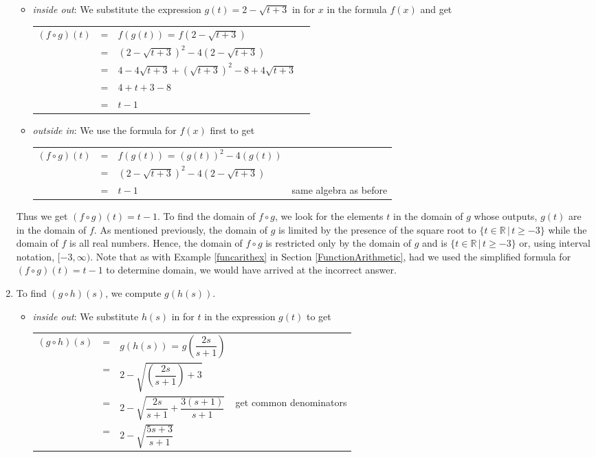 \documentclass{ximera}
\begin{document}
\begin{example}
\begin{enumerate}
\begin{itemize}
\item  \textit{inside out}: We substitute the expression $g(t) = 2 - \sqrt{t+3}$ in for $x$ in the formula $f(x)$ and get 
\begin{longtable}{rclr} $(f \circ g)(t)$ & = & $f(g(t))$ = $f\left(2-\sqrt{t+3}\right)$ & \\ [2pt]
 & = & $\left(2-\sqrt{t+3}\right)^2 - 4\left(2-\sqrt{t+3}\right)$ & \\[2pt] 
 & = & $4 - 4\sqrt{t+3} + \left(\sqrt{t+3}\right)^2 - 8 + 4 \sqrt{t+3}$ & \\ [2pt]
 & = & $4 + t+3 - 8$ & \\ 
 & = & $t-1$ & \\
 \end{longtable}

\item  \textit{outside in}:  We use the formula for $f(x)$ first to get
\begin{longtable}{rclr} $(f \circ g)(t)$ & = & $f(g(t))$ = $\left(g(t)\right)^2 - 4\left(g(t)\right)$& \\ [2pt]
 & = & $\left(2-\sqrt{t+3}\right)^2 - 4\left(2-\sqrt{t+3}\right)$ & \\[2pt] 
 & = & $t-1$ & same algebra as before \\
 \end{longtable}

\end{itemize}

Thus we get $(f \circ g)(t) = t-1$.  To find the domain of $f \circ g$, we look for the elements $t$ in the domain of $g$ whose outputs, $g(t)$ are in the domain of $f$.   As mentioned previously, the domain of $g$ is limited by the presence of the square root to  $\{ t \in \mathbb{R} \, | \, t \geq -3\}$  while the domain of $f$ is all real numbers.  Hence,  the domain of $f \circ g$ is restricted only by the domain of $g$ and is $\{ t \in \mathbb{R} \, | \, t \geq -3\}$ or, using interval notation,  $[-3, \infty)$.  Note that as with Example \ref{funcarithex}  in Section \ref{FunctionArithmetic}, had we used the simplified formula for $(f \circ g)(t) = t-1$  to determine domain, we would have arrived at the incorrect answer.



\item  To find $(g \circ h)(s)$, we compute $g(h(s))$. 

\begin{itemize}

\item  \textit{inside out}: We substitute $h(s)$ in for $t$ in the expression $g(t)$  to get 
\begin{longtable}{rclr} $(g \circ h)(s)$ & = & $g(h(s))$ = $g\left(\dfrac{2s}{s+1}\right)$  & \\ [12pt]
 & = & $2 - \sqrt{\left(\dfrac{2s}{s+1}\right)+3}$ & \\[12pt] 
 & = & $2 - \sqrt{\dfrac{2s}{s+1} + \dfrac{3(s+1)}{s+1}}$ & get common denominators\\ [12pt]
 & = & $2 - \sqrt{\dfrac{5s+3}{s+1}}$ & \\
 \end{longtable}


\end{itemize}
\end{enumerate}
\end{example}
\end{document}
